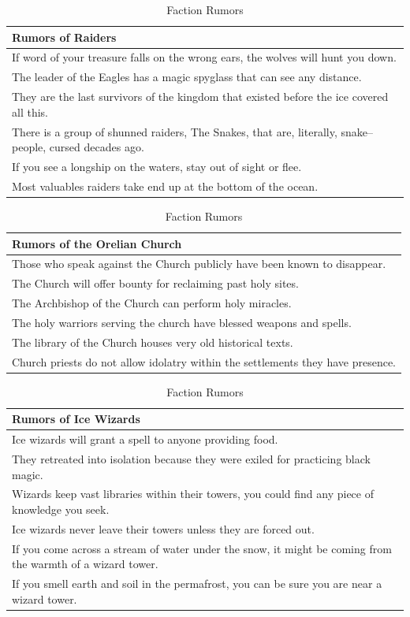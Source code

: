 \documentclass[notitlepage]{article}
\begin{document}
\begin{multicols*}{2}
\begin{table}[t]
  \centering
  \begin{tabular}{|p{}|}
    \hline Rumors of Raiders \\ \hline \hline
    If word of your treasure falls on the wrong ears, the wolves will hunt you down. \\ \hline
    The leader of the Eagles has a magic spyglass that can see any distance. \\ \hline
    They are the last survivors of the kingdom that existed before the ice covered all this. \\ \hline
    There is a group of shunned raiders, The Snakes, that are, literally, snake--people, cursed decades ago. \\ \hline
    If you see a longship on the waters, stay out of sight or flee. \\ \hline
    Most valuables raiders take end up at the bottom of the ocean. \\ \hline
  \end{tabular} \begin{tabular}{|p{}|}
                  \hline Rumors of the Orelian Church \\ \hline \hline
                  Those who speak against the Church publicly have been known to disappear. \\ \hline
                  The Church will offer bounty for reclaiming past holy sites. \\ \hline
                  The Archbishop of the Church can perform holy miracles. \\ \hline
                  The holy warriors serving the church have blessed weapons and spells. \\ \hline
                  The library of the Church houses very old historical texts. \\ \hline
                  Church priests do not allow idolatry within the settlements they have presence. \\ \hline
  \end{tabular} \begin{tabular}{|p{}|}
    \hline Rumors of Ice Wizards \\ \hline \hline
    Ice wizards will grant a spell to anyone providing food. \\ \hline
    They retreated into isolation because they were exiled for practicing black magic. \\ \hline
    Wizards keep vast libraries within their towers, you could find any piece of knowledge you seek. \\ \hline
    Ice wizards never leave their towers unless they are forced out. \\ \hline
    If you come across a stream of water under the snow, it might be coming from the warmth of a wizard tower. \\ \hline
    If you smell earth and soil in the permafrost, you can be sure you are near a wizard tower. \\ \hline
   \end{tabular}
   \caption{Faction Rumors}
  \label{tab:rumors}
\end{table}


\end{multicols*}
\end{document}

